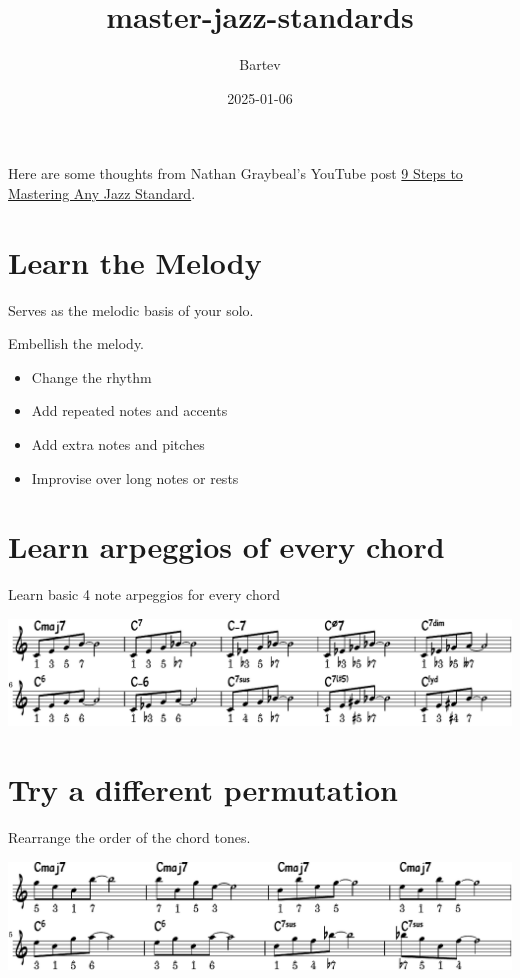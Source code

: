 \documentclass[11pt]{article}
\author{Bartev}
\date{2025-01-06}
\title{master-jazz-standards}
\let\maketitle\relax %
\begin{document}
\maketitle
\tableofcontents

Here are some thoughts from Nathan Graybeal's YouTube post \href{https://www.youtube.com/watch?v=qdobZsTTbbw\&list=LL}{9 Steps to Mastering Any Jazz Standard}.
\section{Learn the Melody}
\label{sec:orgb60bea2}

Serves as the melodic basis of your solo.

Embellish the melody.
\begin{itemize}
\item Change the rhythm
\item Add repeated notes and accents
\item Add extra notes and pitches
\item Improvise over long notes or rests
\end{itemize}
\section{Learn arpeggios of every chord}
\label{sec:org7be3329}

Learn basic 4 note arpeggios for every chord

\begin{center}
\includegraphics[width=0.98\linewidth]{arpeggios.pdf}
\end{center}

\section{Try a different permutation}
\label{sec:org3e1501b}
Rearrange the order of the chord tones.

\begin{center}
\includegraphics[width=0.98\linewidth]{permute-arpeggio.pdf}
\end{center}
\end{document}
